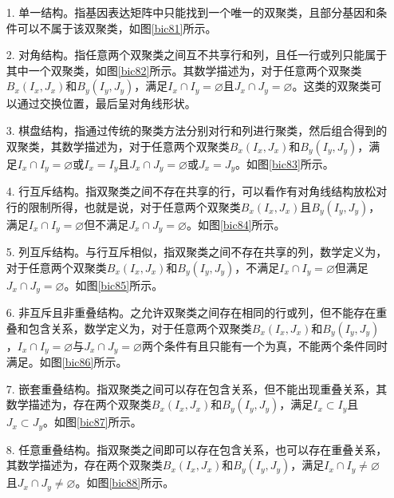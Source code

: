   \begin{enumerate}
    \item[1.] 单一结构。指基因表达矩阵中只能找到一个唯一的双聚类，且部分基因和条件可以不属于该双聚类，如图\ref{bic81}所示。

    \item[2.] 对角结构。指任意两个双聚类之间互不共享行和列，且任一行或列只能属于其中一个双聚类，如图\ref{bic82}所示。其数学描述为，对于任意两个双聚类$B_x(I_x, J_x)$和$B_y(I_y, J_y)$，满足$I_x \cap I_y = \varnothing $且$J_x \cap J_y = \varnothing $。这类的双聚类可以通过交换位置，最后呈对角线形状。
    
    \item[3.] 棋盘结构，指通过传统的聚类方法分别对行和列进行聚类，然后组合得到的双聚类，其数学描述为，对于任意两个双聚类$B_x(I_x, J_x)$和$B_y(I_y, J_y)$，满足$I_x \cap I_y = \varnothing $或$I_x = I_y $且$J_x \cap J_y = \varnothing $或$J_x = J_y $。如图\ref{bic83}所示。
    
    \item[4.] 行互斥结构。指双聚类之间不存在共享的行，可以看作有对角线结构放松对行的限制所得，也就是说，对于任意两个双聚类$B_x(I_x, J_x)$且$B_y(I_y, J_y)$，满足$I_x \cap I_y = \varnothing $但不满足$J_x \cap J_y = \varnothing $。如图\ref{bic84}所示。
    
    \item[5.] 列互斥结构。与行互斥相似，指双聚类之间不存在共享的列，数学定义为，对于任意两个双聚类$B_x(I_x, J_x)$和$B_y(I_y, J_y)$，不满足$I_x \cap I_y = \varnothing $但满足$J_x \cap J_y = \varnothing $。如图\ref{bic85}所示。
    
    \item[6.] 非互斥且非重叠结构。之允许双聚类之间存在相同的行或列，但不能存在重叠和包含关系，数学定义为，对于任意两个双聚类$B_x(I_x, J_x)$和$B_y(I_y, J_y)$，$I_x \cap I_y = \varnothing $与$J_x \cap J_y = \varnothing $两个条件有且只能有一个为真，不能两个条件同时满足。如图\ref{bic86}所示。
    
    \item[7.] 嵌套重叠结构。指双聚类之间可以存在包含关系，但不能出现重叠关系，其数学描述为，存在两个双聚类$B_x(I_x, J_x)$和$B_y(I_y, J_y)$，满足$I_x \subset I_y $且$J_x \subset J_y $。如图\ref{bic87}所示。
    
    \item[8.] 任意重叠结构。指双聚类之间即可以存在包含关系，也可以存在重叠关系，其数学描述为，存在两个双聚类$B_x(I_x, J_x)$和$B_y(I_y, J_y)$，满足$I_x \cap I_y \ne \varnothing $且$J_x \cap J_y \ne \varnothing $。如图\ref{bic88}所示。
  \end{enumerate}

